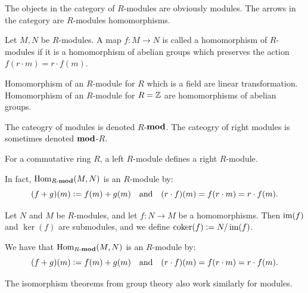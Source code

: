\documentclass[11pt,a4paper]{article}
\begin{document}
\begin{remark}
  The objects in the category of $R$-modules are obviously modules.
  The arrows in the category are $R$-modules homomorphisms.
\end{remark}

\begin{definition}
  Let $M,N$ be $R$-modules.
  A map $f \colon M \to N$ is called a homomorphism of $R$-modules
  if it is a homomorphism of abelian groups which preserves the action
  $f(r \cdot m) = r \cdot f(m)$.
\end{definition}

\begin{remark}
  Homomorphism of an $R$-module for $R$ which is a field
  are linear transformation.
  Homomorphism of an $R$-module for $R = \mathbb{Z}$
  are homomorphisms of abelian groups.
\end{remark}

\begin{remark}
  The cateogry of modules is denoted $R$-$\mathbf{mod}$.
  The cateogry of right modules is sometimes denoted $\mathbf{mod}$-$R$.
\end{remark}

\begin{remark}
  For a commutative ring $R$,
  a left $R$-module defines a right $R$-module.
\end{remark}

\begin{remark}
  In fact, $\operatorname{Hom}_{R\text{-}\mathbf{mod}}(M,N)$ is an $R$-module by:
  \[
    (f + g)(m) := f(m) + g(m) \quad \text{and} \quad
    (r \cdot f)(m) = f(r \cdot m) = r \cdot f(m).
  \]
\end{remark}

\begin{remark}
  Let $N$ and $M$ be $R$-modules,
  and let $f \colon N \to M$ be a homomorphisms.
  Then $\operatorname{im}(f)$ and $\ker(f)$ are submodules,
  and we define $\operatorname{coker}(f) := N/\operatorname{im}(f)$.
\end{remark}

\begin{remark}
  We have that $\operatorname{Hom}_{R\text{-}\mathbf{mod}}(M,N)$ is an $R$-module by:
  \[
    (f + g)(m) := f(m) + g(m) \quad \text{and} \quad
    (r \cdot f)(m) = f(r \cdot m) = r \cdot f(m).
  \]
\end{remark}

\begin{remark}
  The isomorphism theorems from group theory also work similarly
  for modules.
\end{remark}
\end{document}
